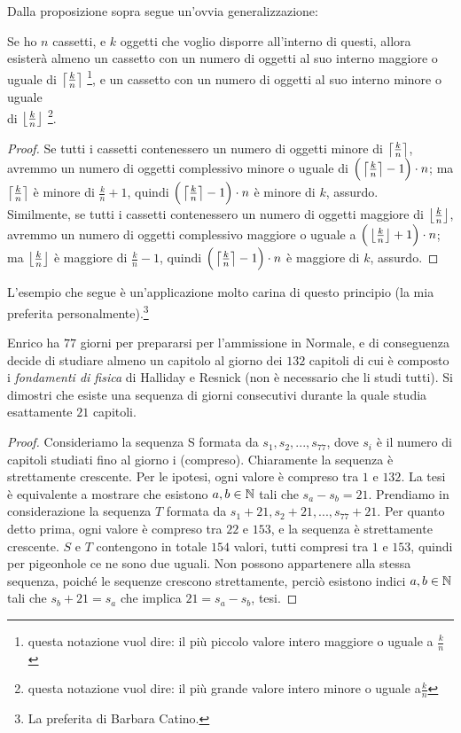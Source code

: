 \documentclass[11pt]{scrartcl}
\begin{document}
	Dalla proposizione sopra segue un'ovvia generalizzazione:
	\begin{proposition}
		Se ho $n$ cassetti, e $k$ oggetti che voglio disporre all'interno di questi, allora esisterà almeno un cassetto con un numero di oggetti al suo interno maggiore o uguale di $\left\lceil \frac{k}{n} \right\rceil$ \footnote{questa notazione vuol dire: il più piccolo valore intero maggiore o uguale a $\frac{k}{n}$}, e un cassetto con un numero di oggetti al suo interno minore o uguale \\
		di $\left\lfloor \frac{k}{n} \right\rfloor$ \footnote{questa notazione vuol dire: il più grande valore intero minore o uguale a$ \frac{k}{n}$}.
	\end{proposition}
	
	\begin{proof}
		Se tutti i cassetti contenessero un numero di oggetti minore di $\left\lceil \frac{k}{n} \right\rceil$, avremmo un numero di oggetti complessivo minore o uguale di $\Big(\left\lceil \frac{k}{n} \right\rceil-1\Big) \cdot n$; ma $\left\lceil \frac{k}{n} \right\rceil$ è minore di $\frac{k}{n}+1$, quindi $\Big(\left\lceil \frac{k}{n} \right\rceil-1\Big) \cdot n$ è minore di $k$, assurdo. \\
		Similmente, se tutti i cassetti contenessero un numero di oggetti maggiore di $\left\lfloor \frac{k}{n} \right\rfloor$, avremmo un numero di oggetti complessivo maggiore o uguale a $\Big(\left\lfloor \frac{k}{n} \right\rfloor+1\Big) \cdot n$; ma $\left\lfloor \frac{k}{n} \right\rfloor$ è maggiore di $\frac{k}{n}-1$, quindi $\Big(\left\lceil \frac{k}{n} \right\rceil-1\Big) \cdot n$ è maggiore di $k$, assurdo.
	\end{proof}
	
	L'esempio che segue è un'applicazione molto carina di questo principio (la mia preferita personalmente).\footnote{La preferita di Barbara Catino.}
	\begin{exercise}
		Enrico ha $77$ giorni per prepararsi per l'ammissione in Normale, e di conseguenza decide di studiare almeno un capitolo al giorno dei $132$ capitoli di cui è composto i \textit{fondamenti di fisica} di Halliday e Resnick (non è necessario che li studi tutti). Si dimostri che esiste una sequenza di giorni consecutivi durante la quale studia esattamente $21$ capitoli.
	\end{exercise}
	\begin{proof}
		Consideriamo la sequenza S formata da $s_1, s_2, ..., s_{77}$, dove $s_i$ è il numero di capitoli studiati fino al giorno i (compreso). Chiaramente la sequenza è strettamente crescente. Per le ipotesi, ogni valore è compreso tra $1$ e $132$. La tesi è equivalente a mostrare che esistono $a,b\in\mathbb N$ tali che $s_a-s_b=21$. Prendiamo in considerazione la sequenza $T$ formata da $s_1+21, s_2+21, ..., s_{77}+21$. Per quanto detto prima, ogni valore è compreso tra $22$ e $153$, e la sequenza è strettamente crescente. $S$ e $T$ contengono in totale $154$ valori, tutti compresi tra $1$ e $153$, quindi per pigeonhole ce ne sono due uguali. Non possono appartenere alla stessa sequenza, poiché le sequenze crescono strettamente, perciò esistono indici $a,b\in\mathbb N$ tali che $s_b+21=s_a $ che implica $21=s_a-s_b$, tesi.
	\end{proof}
\end{document}

